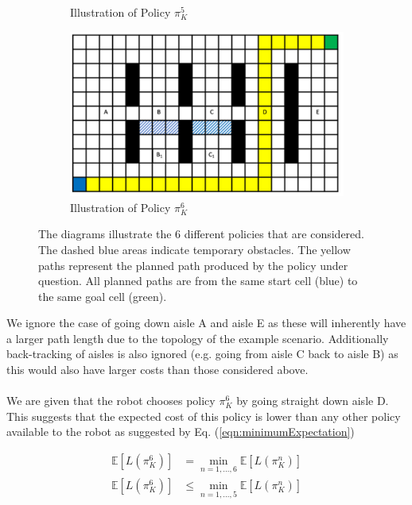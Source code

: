 \documentclass[a4paper,12pt]{article}
\begin{document}
\begin{figure}[htp]
\begin{subfigure}{.45\textwidth}
					\caption{Illustration of Policy $\pi_{K}^{5}$}
					\label{fig:policy5Diagram}
				\end{subfigure}
				\begin{subfigure}{.45\textwidth}
					\centering
					\includegraphics[width=\textwidth]{pathAisleD}
					\caption{Illustration of Policy $\pi_{K}^{6}$}
					\label{fig:policy6Diagram}
				\end{subfigure}
				\caption{The diagrams illustrate the 6 different policies that are considered. The dashed blue areas indicate temporary obstacles. The yellow paths represent the planned path produced by the policy under question. All planned paths are from the same start cell (blue) to the same goal cell (green).}
				\label{fig:policyDiagrams}
			\end{figure}
			
			We ignore the case of going down aisle A and aisle E as these will inherently have a larger path length due to the topology of the example scenario. Additionally back-tracking of aisles is also ignored (e.g. going from aisle C back to aisle B) as this would also have larger costs than those considered above.
			\\
			\\
			We are given that the robot chooses policy $\pi_{K}^{6}$ by going straight down aisle D. This suggests that the expected cost of this policy is lower than any other policy available to the robot as suggested by Eq. (\ref{eqn:minimumExpectation})
			
			\begin{equation}
			\begin{split}
				\mathbb{E}\left[L\left(\pi_{K}^{6}\right)\right] &= \min_{n=1,\dots,6} \mathbb{E}\left[L\left(\pi_{K}^{n}\right)\right] \\
				\mathbb{E}\left[L\left(\pi_{K}^{6}\right)\right] &\leq \min_{n=1,\dots,5} \mathbb{E}\left[L\left(\pi_{K}^{n}\right)\right]
			\end{split}
			\label{eqn:minimumExpectation}
			\end{equation}
			
\end{document}
